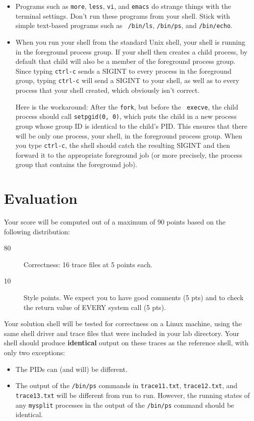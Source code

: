 \documentclass[11pt]{article}
\begin{document}
\begin{itemize}
\item Programs such as {\tt more}, {\tt less}, {\tt vi}, and {\tt emacs}
do strange things with the terminal settings. Don't run these programs
from your shell. Stick with simple text-based programs such as {\tt
/bin/ls}, {\tt /bin/ps}, and {\tt /bin/echo}.

\item When you run your shell from the standard Unix shell, your shell
is running in the foreground process group. If your shell then creates
a child process, by default that child will also be a member of the
foreground process group. Since typing {\tt ctrl-c} sends a SIGINT to every
process in the foreground group, typing {\tt ctrl-c} will send a SIGINT to
your shell, as well as to every process that your shell created, which
obviously isn't correct.

Here is the workaround: After the {\tt fork}, but before the {\tt
execve}, the child process should call {\tt setpgid(0, 0)}, which puts
the child in a new process group whose group ID is identical to the
child's PID. This ensures that there will be only one process, your
shell, in the foreground process group. When you type {\tt ctrl-c}, the
shell should catch the resulting SIGINT and then forward it to the
appropriate foreground job (or more precisely, the process group that
contains the foreground job).
\end{itemize}

\section*{Evaluation}

Your score will be computed out of a maximum of 90 points based on the
following distribution:
\begin{description}
\item[80] Correctness: 16 trace files at 5 points each.
\item[10] Style points. We expect you to have good comments (5 pts)
and to check the return value of EVERY system call (5 pts).
\end{description}

Your solution shell will be tested for correctness on a Linux machine,
using the same shell driver and trace files that were included in your
lab directory. Your shell should produce {\bf identical} output on
these traces as the reference shell, with only two exceptions:
\begin{itemize}
\item The PIDs can (and will) be different.
\item The output of the {\tt /bin/ps} commands in {\tt trace11.txt},
{\tt trace12.txt}, and {\tt trace13.txt} will be different from run to
run.  However, the running states of any {\tt mysplit} processes in
the output of the {\tt /bin/ps} command should be identical.
\end{itemize}
\end{document}
